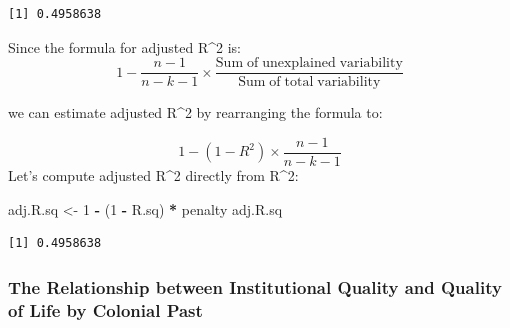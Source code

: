 \documentclass[]{article}
\newenvironment{Shaded}{\begin{snugshade}}{\end{snugshade}}
\newcommand{\KeywordTok}[1]{\textcolor[rgb]{0.13,0.29,0.53}{\textbf{#1}}}
\newcommand{\DecValTok}[1]{\textcolor[rgb]{0.00,0.00,0.81}{#1}}
\newcommand{\StringTok}[1]{\textcolor[rgb]{0.31,0.60,0.02}{#1}}
\newcommand{\CommentTok}[1]{\textcolor[rgb]{0.56,0.35,0.01}{\textit{#1}}}
\newcommand{\OperatorTok}[1]{\textcolor[rgb]{0.81,0.36,0.00}{\textbf{#1}}}
\newcommand{\NormalTok}[1]{#1}
\theoremstyle{definition}
\theoremstyle{definition}
\theoremstyle{definition}
\theoremstyle{remark}
\begin{document}
\begin{Shaded}
\end{Shaded}

\begin{verbatim}
[1] 0.4958638
\end{verbatim}

Since the formula for adjusted R\^{}2 is:
\[ 1 - \frac{n-1}{n-k-1} \times \frac{\mathrm{Sum\;of\;unexplained\;variability}}{\mathrm{Sum\;of\;total\;variability}} \]

we can estimate adjusted R\^{}2 by rearranging the formula to:

\[ 1 - (1-R^2) \times \frac{n-1}{n-k-1} \] Let's compute adjusted R\^{}2
directly from R\^{}2:

\begin{Shaded}
\begin{Highlighting}[]
\NormalTok{adj.R.sq <-}\StringTok{ }\DecValTok{1} \OperatorTok{-}\StringTok{ }\NormalTok{(}\DecValTok{1} \OperatorTok{-}\StringTok{ }\NormalTok{R.sq) }\OperatorTok{*}\StringTok{ }\NormalTok{penalty}
\NormalTok{adj.R.sq}
\end{Highlighting}
\end{Shaded}

\begin{verbatim}
[1] 0.4958638
\end{verbatim}

\subsubsection{The Relationship between Institutional Quality and
Quality of Life by Colonial
Past}\label{the-relationship-between-institutional-quality-and-quality-of-life-by-colonial-past}
\end{document}
